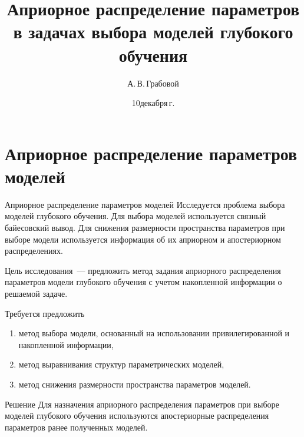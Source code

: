 \documentclass[10pt,pdf,hyperref={unicode}]{beamer}
\title[Априорное распределение параметров в задачах выбора моделей глубокого обучения]{Априорное распределение параметров \\в задачах выбора моделей глубокого обучения}
\author{А.\,В.\,Грабовой}
\institute[]{Конференция \\ <<Математические методы распознавания образов>>}
\date[2021]{\small 10\;декабря\;2021\,г.}
\begin{document}
\begin{frame}
\titlepage
\end{frame}

\section{Априорное распределение параметров моделей}
\begin{frame}{Априорное распределение параметров моделей}
\bigskip
Исследуется проблема выбора моделей глубокого обучения. Для выбора моделей используется связный байесовский вывод. Для снижения размерности пространства параметров при выборе модели используется информация об их априорном и апостериорном распределениях. 
\begin{block}{Цель исследования~---}
предложить метод задания априорного распределения параметров модели глубокого обучения с учетом накопленной информации о решаемой задаче.
\end{block}
\begin{block}{Требуется предложить}
\justifying
\begin{enumerate}[1)]
\item метод выбора модели, основанный на использовании привилегированной и накопленной информации,
\item метод выравнивания структур параметрических моделей,
\item метод снижения размерности пространства параметров моделей.
\end{enumerate}
\end{block}
\begin{block}{Решение}
Для назначения априорного распределения параметров при выборе моделей глубокого обучения используются апостериорные распределения параметров ранее полученных моделей.
\end{block}
\end{frame}
\end{document}
